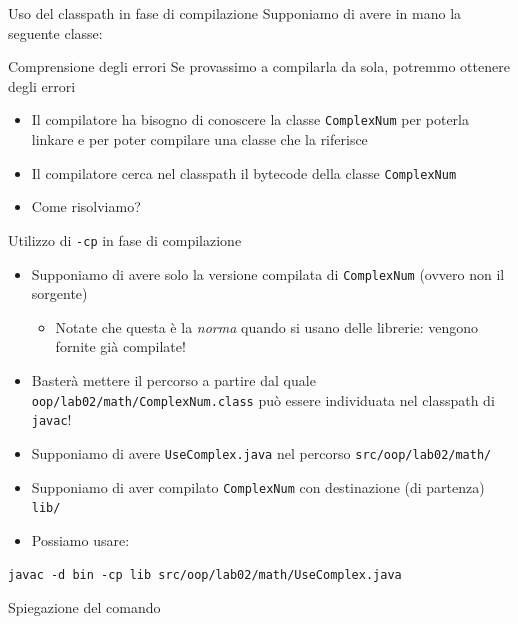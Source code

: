 \documentclass[xcolor=dvipsnames,presentation]{beamer}
\begin{document}
\begin{frame}{Uso del classpath in fase di compilazione}
   Supponiamo di avere in mano la seguente classe:
    \begin{block}{Comprensione degli errori}
        Se provassimo a compilarla da sola, potremmo ottenere degli errori
        \begin{itemize}
        \item Il compilatore ha bisogno di conoscere la classe \texttt{ComplexNum} per poterla
linkare e per poter compilare una classe che la riferisce
        \item Il compilatore cerca nel classpath il bytecode della classe \texttt{ComplexNum}
        \item Come risolviamo?
        \end{itemize}
    \end{block}
    \begin{block}{Utilizzo di \texttt{-cp} in fase di compilazione}
        \begin{itemize}
            \item Supponiamo di avere solo la versione compilata di \texttt{ComplexNum} (ovvero non il sorgente)
            \begin{itemize}
                \item Notate che questa è la \textit{norma} quando si usano delle librerie: vengono
                fornite già compilate!
            \end{itemize}
            \item Basterà mettere il percorso a partire dal quale \texttt{oop/lab02/math/ComplexNum.class} può essere individuata nel
            classpath di \texttt{javac}!
            \item Supponiamo di avere \texttt{UseComplex.java} nel percorso
            \texttt{src/oop/lab02/math/}
            \item Supponiamo di aver compilato \texttt{ComplexNum} con destinazione (di partenza) \texttt{lib/}
            \item Possiamo usare:
        \end{itemize}
        \alert{\texttt{javac -d bin -cp lib src/oop/lab02/math/UseComplex.java}}
    \end{block}
    \begin{block}{Spiegazione del comando}

\end{block}
\end{frame}
\end{document}
